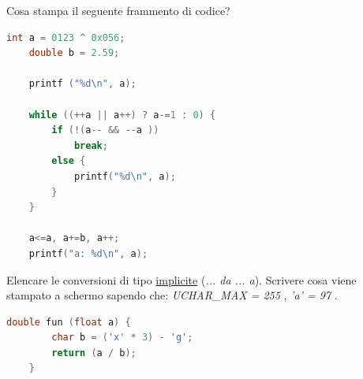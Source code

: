 
\begin{center}
\end{center}

\vspace{5mm}

\noindent{}

\begin{questions}


\question[5]
Cosa stampa il seguente frammento di codice?

\begin{minipage}[t]{0.4\linewidth}
	\begin{lstlisting}[language=C]
	int a = 0123 ^ 0x056;
	double b = 2.59;

	printf ("%d\n", a);
	
	while ((++a || a++) ? a-=1 : 0) {
		if (!(a-- && --a ))
			break;
		else {
			printf("%d\n", a); 
		}
	}
	
	a<=a, a+=b, a++;
	printf("a: %d\n", a); 
	\end{lstlisting}
\end{minipage}
\begin{minipage}[t]{0.6\linewidth}
\end{minipage}



\question[6]
Elencare le conversioni di tipo \underline{implicite} (\emph{... da ... a}). Scrivere cosa viene stampato a schermo sapendo che: \emph{UCHAR\_MAX = 255} , \emph{'a' = 97} .

\begin{minipage}[t]{0.4\linewidth}
	\begin{lstlisting}[language=C]
	double fun (float a) {
		char b = ('x' * 3) - 'g';
		return (a / b);
	}
	

\end{lstlisting}
\end{minipage}
\end{questions}
